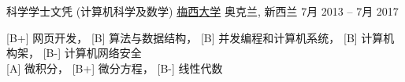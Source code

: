 

\begin{cventries}
	\cventry
	{科学学士文凭 (计算机科学及数学)}
	{\href{http://www.massey.ac.nz/}{梅西大学}}
	{奥克兰, \enskip 新西兰}
	{7月 2013 – 7月 2017}
	{
		\begin{cvitems}
		\item
			{[B+] 网页开发}，
			{[B] 算法与数据结构}，
			{[B] 并发编程和计算机系统}，
			{[B] 计算机构架}，
			{[B-] 计算机网络安全}\\
			{[A] 微积分}，
			{[B+] 微分方程}，
			{[B-] 线性代数}
		\end{cvitems}
	}
\end{cventries}



